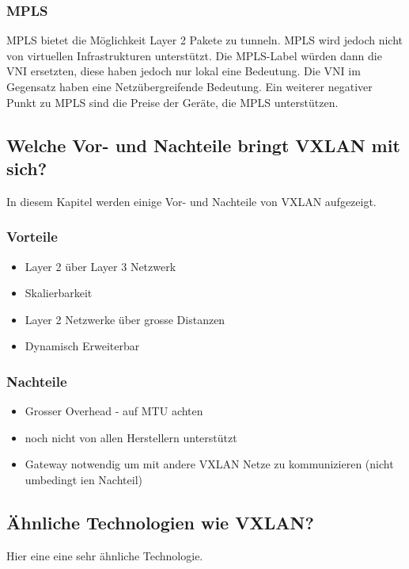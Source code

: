 \documentclass[a4,12pt]{scrartcl}
\begin{document}
\subsubsection{MPLS}
MPLS bietet die Möglichkeit Layer 2 Pakete zu tunneln. MPLS wird jedoch nicht von virtuellen Infrastrukturen unterstützt. Die MPLS-Label würden dann die VNI ersetzten, diese haben jedoch nur lokal eine Bedeutung. Die VNI im Gegensatz haben eine Netzübergreifende Bedeutung. Ein weiterer negativer Punkt zu MPLS sind die Preise der Geräte, die MPLS unterstützen. 
\newpage

\subsection{Welche Vor- und Nachteile bringt VXLAN mit sich?}
In diesem Kapitel werden einige Vor- und Nachteile von VXLAN aufgezeigt. 

\subsubsection{Vorteile}
\begin{itemize}
\item Layer 2 über Layer 3 Netzwerk 
\item Skalierbarkeit 
\item Layer 2 Netzwerke über grosse Distanzen
\item Dynamisch Erweiterbar 
\end{itemize}

\subsubsection{Nachteile}
\begin{itemize}
\item Grosser Overhead - auf MTU achten 
\item noch nicht von allen Herstellern unterstützt
\item Gateway notwendig um mit andere VXLAN Netze zu kommunizieren (nicht umbedingt ien Nachteil) 
\end{itemize}

\subsection{Ähnliche Technologien wie VXLAN?}
Hier eine eine sehr ähnliche Technologie. 
\end{document}
